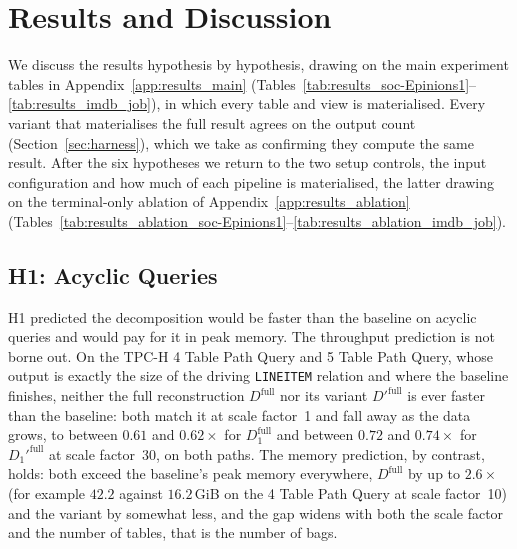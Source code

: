 \section{Results and Discussion}
\label{sec:results_discussion}

We discuss the results hypothesis by hypothesis, drawing on the main experiment tables in Appendix~\ref{app:results_main} (Tables~\ref{tab:results_soc-Epinions1}--\ref{tab:results_imdb_job}), in which every table and view is materialised. Every variant that materialises the full result agrees on the output count (Section~\ref{sec:harness}), which we take as confirming they compute the same result. After the six hypotheses we return to the two setup controls, the input configuration and how much of each pipeline is materialised, the latter drawing on the terminal-only ablation of Appendix~\ref{app:results_ablation} (Tables~\ref{tab:results_ablation_soc-Epinions1}--\ref{tab:results_ablation_imdb_job}).

\subsection{H1: Acyclic Queries}
\label{sec:disc_h1}

H1 predicted the decomposition would be faster than the baseline on acyclic queries and would pay for it in peak memory. The throughput prediction is not borne out. On the TPC-H 4 Table Path Query and 5 Table Path Query, whose output is exactly the size of the driving \texttt{LINEITEM} relation and where the baseline finishes, neither the full reconstruction $D^{\text{full}}$ nor its variant $D'^{\text{full}}$ is ever faster than the baseline: both match it at scale factor~1 and fall away as the data grows, to between $0.61$ and $0.62\times$ for $D_1^{\text{full}}$ and between $0.72$ and $0.74\times$ for $D_1'^{\text{full}}$ at scale factor~30, on both paths. The memory prediction, by contrast, holds: both exceed the baseline's peak memory everywhere, $D^{\text{full}}$ by up to $2.6\times$ (for example $42.2$ against $16.2$\,GiB on the 4 Table Path Query at scale factor~10) and the variant by somewhat less, and the gap widens with both the scale factor and the number of tables, that is the number of bags.

